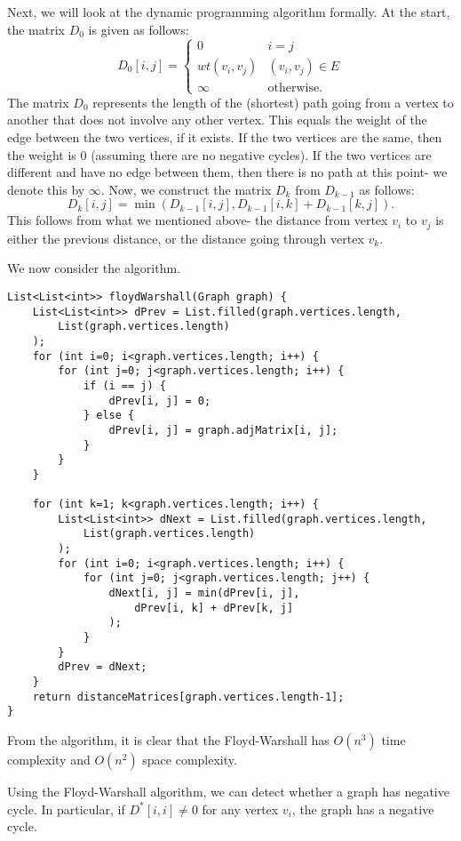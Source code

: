 \documentclass[a4paper, openany]{memoir}
\begin{document}
    Next, we will look at the dynamic programming algorithm formally. At the start, the matrix $D_0$ is given as follows:
    \[D_0[i, j] = \begin{cases}
        0 & i = j \\
        wt(v_i, v_j) & (v_i, v_j) \in E \\
        \infty & \text{otherwise}.
    \end{cases}\]
    The matrix $D_0$ represents the length of the (shortest) path going from a vertex to another that does not involve any other vertex. This equals the weight of the edge between the two vertices, if it exists. If the two vertices are the same, then the weight is 0 (assuming there are no negative cycles). If the two vertices are different and have no edge between them, then there is no path at this point- we denote this by $\infty$. Now, we construct the matrix $D_k$ from $D_{k-1}$ as follows:
    \[D_k[i, j] = \min (D_{k-1}[i, j], D_{k-1}[i, k] + D_{k-1}[k, j]).\]
    This follows from what we mentioned above- the distance from vertex $v_i$ to $v_j$ is either the previous distance, or the distance going through vertex $v_k$.

    We now consider the algorithm.
\begin{lstlisting}[language=pseudocode]
List<List<int>> floydWarshall(Graph graph) {
    List<List<int>> dPrev = List.filled(graph.vertices.length, 
        List(graph.vertices.length)
    );
    for (int i=0; i<graph.vertices.length; i++) {
        for (int j=0; j<graph.vertices.length; i++) {
            if (i == j) {
                dPrev[i, j] = 0;
            } else {
                dPrev[i, j] = graph.adjMatrix[i, j];
            }
        }
    }

    for (int k=1; k<graph.vertices.length; i++) {
        List<List<int>> dNext = List.filled(graph.vertices.length, 
            List(graph.vertices.length)
        );
        for (int i=0; i<graph.vertices.length; i++) {
            for (int j=0; j<graph.vertices.length; j++) {
                dNext[i, j] = min(dPrev[i, j],
                    dPrev[i, k] + dPrev[k, j]
                );
            }
        }
        dPrev = dNext;
    }
    return distanceMatrices[graph.vertices.length-1];
}
\end{lstlisting}
    From the algorithm, it is clear that the Floyd-Warshall has $O(n^3)$ time complexity and $O(n^2)$ space complexity.

    Using the Floyd-Warshall algorithm, we can detect whether a graph has negative cycle. In particular, if $D^*[i, i] \neq 0$ for any vertex $v_i$, the graph has a negative cycle.
\end{document}
